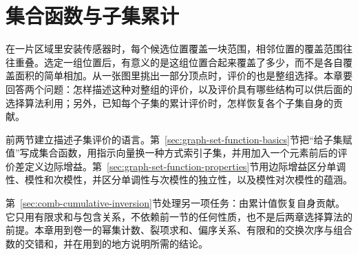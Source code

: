 \chapter{集合函数与子集累计}
\label{chap:set-functions}
\label{chap:graph-set-functions}

在一片区域里安装传感器时，每个候选位置覆盖一块范围，相邻位置的覆盖范围往往重叠。选定一组位置后，有意义的是这组位置合起来覆盖了多少，而不是各自覆盖面积的简单相加。从一张图里挑出一部分顶点时，评价的也是整组选择。本章要回答两个问题：怎样描述这种对整组的评价，以及评价具有哪些结构可以供后面的选择算法利用；另外，已知每个子集的累计评价时，怎样恢复各个子集自身的贡献。

前两节建立描述子集评价的语言。第~\ref{sec:graph-set-function-basics}节把“给子集赋值”写成集合函数，用指示向量换一种方式索引子集，并用加入一个元素前后的评价差定义边际增益。第~\ref{sec:graph-set-function-properties}节用边际增益区分单调性、模性和次模性，并区分单调性与次模性的独立性，以及模性对次模性的蕴涵。

第~\ref{sec:comb-cumulative-inversion}节处理另一项任务：由累计值恢复自身贡献。它只用有限求和与包含关系，不依赖前一节的任何性质，也不是后两章选择算法的前提。本章用到卷一的幂集计数、裂项求和、偏序关系、有限和的交换次序与组合数的交错和，并在用到的地方说明所需的结论。





